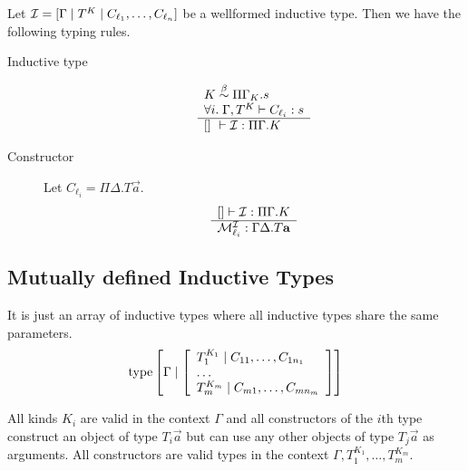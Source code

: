 Let ${\cal I} = [\Gamma \mid T^K \mid C_{\ell_1}, \ldots, C_{\ell_n}]$ be a wellformed
inductive type. Then we have the following typing rules.

\begin{description}

    \item [Inductive type]
        $$
            \rulev{
                K \; \betaeq\; \Pi \Gamma_K. s
                \\
                \forall i.\; \Gamma, T^K \vdash C_{\ell_i}: s
            }
            {
                [] \vdash \Ind : \Pi \Gamma. K
            }
        $$


    \item [Constructor] Let $C_{\ell_i} = \Pi \Delta. T \vec a$.
        $$
        \begin{array}{l} 
            [] \vdash {\cal I}: \Pi \Gamma. K
         \\ \hline 
            {\cal M}^{\cal I}_{\ell_i}: \Gamma \Delta.T {\mathbf a}
         \end{array}
        $$
\end{description}






\subsection{Mutually defined Inductive Types}

It is just an array of inductive types where all inductive types share the same
parameters.
$$
    {\text{type}}
    \left[\Gamma \mid
    \left[ \begin{array}{lllll} 
        T_1^{K_1} \mid C_{11}, \ldots, C_{1n_1}
        \\
        \ldots
        \\
        T_m^{K_m} \mid C_{m1}, \ldots, C_{mn_m}
     \end{array} \right]
    \right]
$$

All kinds $K_i$ are valid in the context $\Gamma$ and all constructors of the
$i$th type construct an object of type $T_i \vec a$ but can use any other
objects of type $T_j \vec a$ as arguments. All constructors are valid types in
the context $\Gamma, T_1^{K_1}, \ldots , T_m^{K_m}$.

